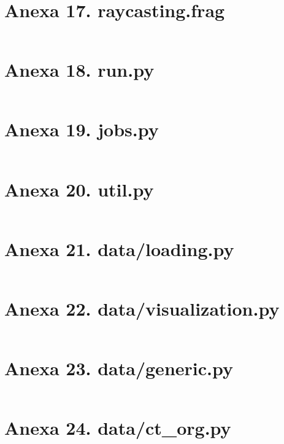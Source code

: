 \section{Anexa 17. raycasting.frag}
\label{appendix:17_raycasting_frag}
\inputminted[linenos,tabsize=4,breaklines]{C++}{code/cpp/raycasting.frag}


\section{Anexa 18. run.py}
\label{appendix:18_run_py}
\inputminted[linenos,tabsize=4,breaklines]{py}{code/python/run.py}

\section{Anexa 19. jobs.py}
\label{appendix:19_jobs_py}
\inputminted[linenos,tabsize=4,breaklines]{py}{code/python/jobs.py}

\section{Anexa 20. util.py}
\label{appendix:20_util_py}
\inputminted[linenos,tabsize=4,breaklines]{py}{code/python/util.py}


\section{Anexa 21. data/loading.py}
\label{appendix:21_data_load_py}
\inputminted[linenos,tabsize=4,breaklines]{py}{code/python/data/loading.py}

\section{Anexa 22. data/visualization.py}
\label{appendix:22_data_visualization_py}
\inputminted[linenos,tabsize=4,breaklines]{py}{code/python/data/visualization.py}

\section{Anexa 23. data/generic.py}
\label{appendix:23_data_generic_py}
\inputminted[linenos,tabsize=4,breaklines]{py}{code/python/data/generic.py}

\section{Anexa 24. data/ct\_org.py}
\label{appendix:24_data_ct_org_py}
\inputminted[linenos,tabsize=4,breaklines]{py}{code/python/data/ct_org.py}


